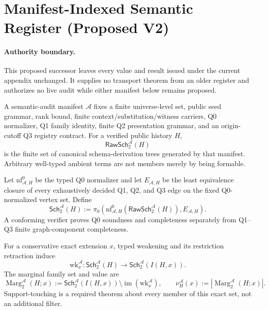 
\section{Manifest-Indexed Semantic Register (Proposed V2)}
\label{sec:semantic-register-manifest-v2-proposed}

\paragraph{Authority boundary.}
This proposed successor leaves every value and result issued under the current
appendix unchanged.  It supplies no transport theorem from an older register
and authorizes no live audit while either manifest below remains proposed.

\begin{definition}
A semantic-audit manifest \(\mathcal A\) fixes a finite universe-level set,
public seed grammar, rank bound, finite context/substitution/witness carriers,
Q0 normalizer, Q1 family identity, finite Q2 presentation grammar, and an
origin-cutoff Q3 registry contract.  For a verified public history \(H\),
\[
  \mathsf{RawSch}^{\mathcal A}_{2}(H)
\]
is the finite set of canonical schema-derivation trees generated by that
manifest.  Arbitrary well-typed ambient terms are not members merely by being
formable.
\end{definition}

\begin{definition}
Let \(\mathrm{nf}^{0}_{\mathcal A,H}\) be the typed Q0 normalizer and let
\(E_{\mathcal A,H}\) be the least equivalence closure of every exhaustively
decided Q1, Q2, and Q3 edge on the fixed Q0-normalized vertex set.  Define
\[
  \mathsf{Sch}^{\mathcal A}_{2}(H)
  :=
  \pi_0\!\left(
    \mathrm{nf}^{0}_{\mathcal A,H}
      (\mathsf{RawSch}^{\mathcal A}_{2}(H)),
    E_{\mathcal A,H}
  \right).
\]
A conforming verifier proves Q0 soundness and completeness separately from
Q1--Q3 finite graph-component completeness.
\end{definition}

\begin{definition}
For a conservative exact extension \(x\), typed weakening and its restriction
retraction induce
\[
  \mathrm{wk}^{\mathcal A}_x:
  \mathsf{Sch}^{\mathcal A}_{2}(H)
  \longrightarrow
  \mathsf{Sch}^{\mathcal A}_{2}(I(H,x)).
\]
The marginal family set and value are
\[
  \operatorname{Marg}^{\mathcal A}_2(H;x)
  :=
  \mathsf{Sch}^{\mathcal A}_{2}(I(H,x))
  \setminus
  \operatorname{im}(\mathrm{wk}^{\mathcal A}_x),
  \qquad
  \nu^{\mathcal A}_H(x)
  :=
  \left|\operatorname{Marg}^{\mathcal A}_2(H;x)\right|.
\]
Support-touching is a required theorem about every member of this exact set,
not an additional filter.
\end{definition}

